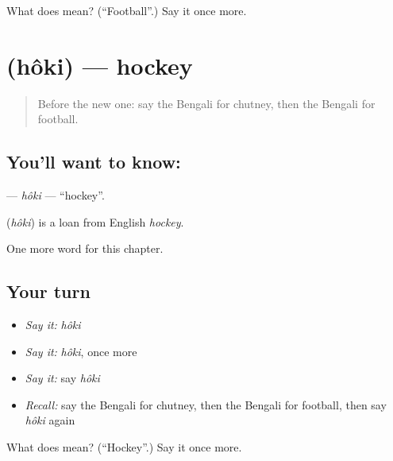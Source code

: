 \begin{tcolorbox}[breakable,colback=teal!4,colframe=teal!35!black,title={Before you move on}]
What does  mean? (\textquotedblleft{}Football\textquotedblright{}.) Say it once more.
\end{tcolorbox}
\section[\texorpdfstring{\bn{হকি} (hôki)}{হকি (hôki)}]{ (hôki) — hockey}

\label{lesson:BN-C197-hoki}



\begin{quote}
Before the new one: say the Bengali for chutney, then the Bengali for football.
\end{quote}

\subsection*{You'll want to know: }
\textbf{} — \emph{hôki} — \textquotedblleft{}hockey\textquotedblright{}.

\begin{cousinweb}
\textbf{} (\emph{hôki}) is a loan from English \emph{hockey}.
\end{cousinweb}

\begin{grammarlens}[title={What you've built}]
One more word for this chapter.
\end{grammarlens}

\subsection*{Your turn}
\begin{itemize}
\raggedright
  \item \emph{Say it:} \emph{hôki}
  \item \emph{Say it:} \emph{hôki}, once more
  \item \emph{Say it:} say \emph{hôki}
  \item \emph{Recall:} say the Bengali for chutney, then the Bengali for football, then say \emph{hôki} again
\end{itemize}

\begin{tcolorbox}[breakable,colback=teal!4,colframe=teal!35!black,title={Before you move on}]
What does  mean? (\textquotedblleft{}Hockey\textquotedblright{}.) Say it once more.
\end{tcolorbox}
